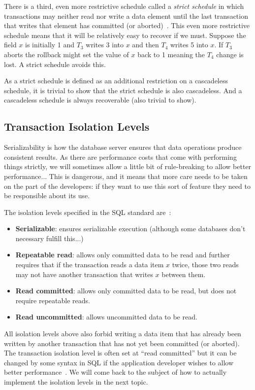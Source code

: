 There is a third, even more restrictive schedule called a \textit{strict schedule} in which transactions may neither read nor write a data element until the last transaction that writes that element has committed (or aborted)~\cite{fds}. This even more restrictive schedule means that it will be relatively easy to recover if we must. Suppose the field $x$ is initially 1 and $T_{3}$ writes 3 into $x$ and then $T_{4}$ writes 5 into $x$. If $T_{3}$ aborts the rollback might set the value of $x$ back to 1 meaning the $T_{4}$ change is lost. A strict schedule avoids this.

As a strict schedule is defined as an additional restriction on a cascadeless schedule, it is trivial to show that the strict schedule is also cascadeless.  And a cascadeless schedule is always recoverable (also trivial to show). 

\subsection*{Transaction Isolation Levels}

Serializability is how the database server ensures that data operations produce consistent results. As there are performance costs that come with performing things strictly, we will sometimes allow a little bit of rule-breaking to allow better performance... This is dangerous, and it means that more care needs to be taken on the part of the developers: if they want to use this sort of feature they need to be responsible about its use.

The isolation levels specified in the SQL standard are~\cite{dsc}:
\begin{itemize}
	\item \textbf{Serializable}: ensures serializable execution (although some databases don't necessary fulfill this...)
	\item \textbf{Repeatable read}: allows only committed data to be read and further requires that if the transaction reads a data item $x$ twice, those two reads may not have another transaction that writes $x$ between them.
	\item \textbf{Read committed}: allows only committed data to be read, but does not require repeatable reads.
	\item \textbf{Read uncommitted}: allows uncommitted data to be read.
\end{itemize}

All isolation levels above also forbid writing a data item that has already been written by another transaction that has not yet been committed (or aborted). The transaction isolation level is often set at ``read committed'' but it can be changed by some syntax in SQL if the application developer wishes to allow better performance~\cite{dsc}. We will come back to the subject of how to actually implement the isolation levels in the next topic.

